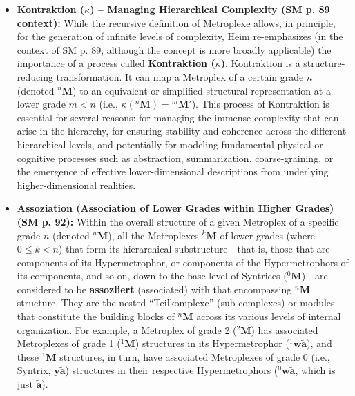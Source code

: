 \documentclass[12pt]{article}
\newcommand{\q}[1]{\enquote{#1}}
\newcommand{\syntrix}{\bm{y\widetilde{a}}}
\newcommand{\metrophor}{\bm{\widetilde{a}}}
\newcommand{\metroplex}[1]{{}^{#1}\mathbf{M}}
\newcommand{\hypersyntrix}{\metroplex{1}}
\newcommand{\hypermetrophor}[1]{{}^{#1}\mathbf{w\widetilde{a}}}
\begin{document}
\begin{itemize}
    \item \textbf{Kontraktion (\( \kappa \)) – Managing Hierarchical Complexity (SM p. 89 context):}
    While the recursive definition of Metroplexe allows, in principle, for the generation of infinite levels of complexity, Heim re-emphasizes (in the context of SM p. 89, although the concept is more broadly applicable) the importance of a process called \textbf{Kontraktion (\( \kappa \))}. Kontraktion is a structure-reducing transformation. It can map a Metroplex of a certain grade \( n \) (denoted \( \metroplex{n} \)) to an equivalent or simplified structural representation at a lower grade \( m < n \) (i.e., \( \kappa(\metroplex{n}) = \metroplex{m}' \)). This process of Kontraktion is essential for several reasons: for managing the immense complexity that can arise in the hierarchy, for ensuring stability and coherence across the different hierarchical levels, and potentially for modeling fundamental physical or cognitive processes such as abstraction, summarization, coarse-graining, or the emergence of effective lower-dimensional descriptions from underlying higher-dimensional realities.

    \item \textbf{Assoziation (Association of Lower Grades within Higher Grades) (SM p. 92):}
    Within the overall structure of a given Metroplex of a specific grade \( n \) (denoted \( \metroplex{n} \)), all the Metroplexes \( \metroplex{k} \) of lower grades (where \( 0 \leq k < n \)) that form its hierarchical substructure—that is, those that are components of its Hypermetrophor, or components of the Hypermetrophors of its components, and so on, down to the base level of Syntrices (\(\metroplex{0}\))—are considered to be \textbf{assoziiert} (associated) with that encompassing \( \metroplex{n} \) structure. They are the nested \q{Teilkomplexe} (sub-complexes) or modules that constitute the building blocks of \( \metroplex{n} \) across its various levels of internal organization. For example, a Metroplex of grade 2 (\( \metroplex{2} \)) has associated Metroplexes of grade 1 (\( \hypersyntrix \)) structures in its Hypermetrophor (\( \hypermetrophor{1} \)), and these \( \hypersyntrix \) structures, in turn, have associated Metroplexes of grade 0 (i.e., Syntrix, \( \syntrix \)) structures in their respective Hypermetrophors (\( \hypermetrophor{0} \), which is just \( \metrophor \)).


\end{itemize}
\end{document}
